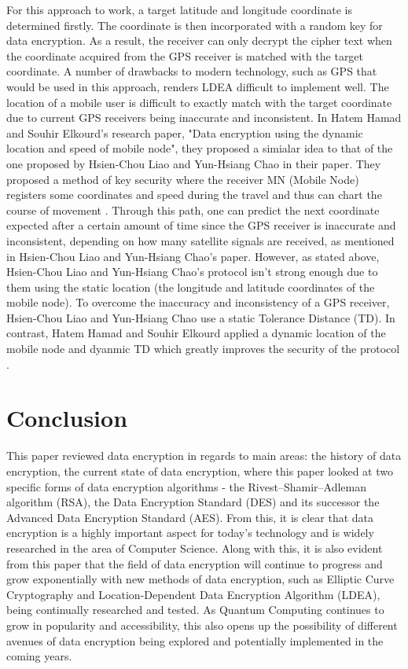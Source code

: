 \documentclass[journal]{IEEEtran}
\begin{document}
For this approach to work, a target latitude and longitude coordinate is determined firstly. The coordinate is then incorporated with a random key for data encryption. As a result, the receiver can only decrypt the cipher text when the coordinate acquired from the GPS receiver is matched with the target coordinate. A number of drawbacks to modern technology, such as GPS that would be used in this approach, renders LDEA difficult to implement well. The location of a mobile user is difficult to exactly match with the target coordinate due to current GPS receivers being inaccurate and inconsistent.
\newline\newline
In Hatem Hamad and Souhir Elkourd's research paper, "Data encryption using the dynamic location and speed of mobile node", they proposed a simialar idea to that of the one proposed by Hsien-Chou Liao and Yun-Hsiang Chao in their paper. They proposed a method of key security where the receiver MN (Mobile Node) registers some coordinates and speed during the travel and thus can chart the course of movement \cite{encryption_mobile_node}. Through this path, one can predict the next coordinate expected after a certain amount of time since the GPS receiver is inaccurate and inconsistent, depending on how many satellite signals are received, as mentioned in Hsien-Chou Liao and Yun-Hsiang Chao's paper. However, as stated above, Hsien-Chou Liao and Yun-Hsiang Chao's protocol isn't strong enough due to them using the static location (the longitude and latitude coordinates of the mobile node). To overcome the inaccuracy and inconsistency of a GPS receiver, Hsien-Chou Liao and Yun-Hsiang Chao use a static Tolerance Distance (TD). In contrast, Hatem Hamad and Souhir Elkourd applied a dynamic location of the mobile node and dyanmic TD which greatly improves the security of the protocol \cite{encryption_mobile_node}.

\section{\textbf{Conclusion}}
This paper reviewed data encryption in regards to  main areas: the history of data encryption, the current state of data encryption, where this paper looked at two specific forms of data encryption algorithms - the Rivest–Shamir–Adleman algorithm (RSA), the Data Encryption Standard (DES) and its successor the Advanced Data Encryption Standard (AES). From this, it is clear that data encryption is a highly important aspect for today's technology and is widely researched in the area of Computer Science. Along with this, it is also evident from this paper that the field of data encryption will continue to progress and grow exponentially with new methods of data encryption, such as Elliptic Curve Cryptography and Location-Dependent Data Encryption Algorithm (LDEA), being continually researched and tested. As Quantum Computing continues to grow in popularity and accessibility, this also opens up the possibility of different avenues of data encryption being explored and potentially implemented in the coming years.
\end{document}
